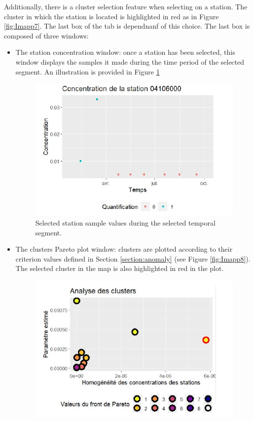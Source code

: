Additionally, there is a cluster selection feature when selecting on a station. The cluster in which the station is located is highlighted in red as in Figure \ref{fig:Imapp7}. The last box of the tab is dependnanf of this choice. The last box is composed of three windows:   
\begin{itemize}
\item The station concentration window: once a station has been selected, this window displays the samples it made during the time period of the selected segment. An illustration is provided in Figure \ref{fig:Imapp9}
\begin{figure}[ht]
 \centering
 \includegraphics[]{figs/Chap6/Im_app9.pdf}
 \caption{Selected station sample values during the selected temporal segment.}
 \label{fig:Imapp9}
\end{figure}
\item The clusters Pareto plot window: clusters are plotted according to their criterion values defined in Section \ref{section:anomaly} (see Figure \ref{fig:Imapp8}). The selected cluster in the map is also highlighted in red in the plot. 
\begin{figure}[ht]
 \centering
 \includegraphics[]{figs/Chap6/Im_app8.pdf}

\end{figure}
\end{itemize}
